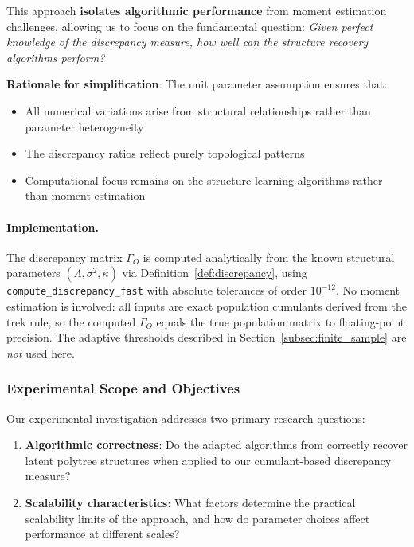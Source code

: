 \documentclass[11pt,a4paper]{article}
\numberwithin{equation}{section}
\begin{document}
This approach \textbf{isolates algorithmic performance} from moment estimation challenges, allowing us to focus on the fundamental question: \emph{Given perfect knowledge of the discrepancy measure, how well can the structure recovery algorithms perform?}

\textbf{Rationale for simplification}: The unit parameter assumption ensures that:
\begin{itemize}
\item All numerical variations arise from structural relationships rather than parameter heterogeneity
\item The discrepancy ratios reflect purely topological patterns  
\item Computational focus remains on the structure learning algorithms rather than moment estimation
\end{itemize}

\paragraph{Implementation.}
The discrepancy matrix $\Gamma_O$ is computed analytically from the known
structural parameters $(\Lambda,\sigma^2,\kappa)$ via
Definition~\ref{def:discrepancy}, using \texttt{compute\_discrepancy\_fast}
with absolute tolerances of order $10^{-12}$.  No moment estimation is
involved: all inputs are exact population cumulants derived from the trek
rule, so the computed $\Gamma_O$ equals the true population matrix to
floating-point precision.  The adaptive thresholds described in
Section~\ref{subsec:finite_sample} are \emph{not} used here.

\subsubsection{Experimental Scope and Objectives}

Our experimental investigation addresses two primary research questions:

\begin{enumerate}[label=(\arabic*)]
\item \textbf{Algorithmic correctness}: Do the adapted algorithms from \citet{etesami:kiyavash:coleman:2016} correctly recover latent polytree structures when applied to our cumulant-based discrepancy measure?

\item \textbf{Scalability characteristics}: What factors determine the practical scalability limits of the approach, and how do parameter choices affect performance at different scales?
\end{enumerate}
\end{document}
